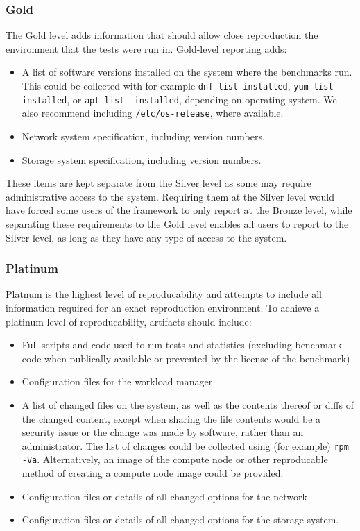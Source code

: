 \documentclass[conference]{IEEEtran}
\begin{document}
\subsubsection{Gold}

The Gold level adds information that should allow close reproduction
the environment that the tests were run in. Gold-level reporting adds:

\begin{itemize}
    \item A list of software versions installed on the system where the 
    benchmarks run. This could be collected with for example
    \texttt{dnf list installed}, \texttt{yum list installed}, or 
    \texttt{apt list --installed}, depending on operating system. We also 
    recommend including \texttt{/etc/os-release}, where available.
    \item Network system specification, including version numbers.
    \item Storage system specification, including version numbers.
\end{itemize}

These items are kept separate from the Silver level as some may require 
administrative access to the system. Requiring them at the Silver level would 
have forced some users of the framework to only report at the Bronze level, 
while separating these requirements to the Gold level enables all users to 
report to the Silver level, as long as they have any type of access to the 
system.

\subsubsection{Platinum}

Platnum is the highest level of reproducability and attempts to include all 
information required for an exact reproduction environment. To achieve a 
platinum level of reproducability, artifacts should include:

\begin{itemize}
    \item Full scripts and code used to run tests and statistics (excluding 
    benchmark code when publically available or prevented by the license of the 
    benchmark)
    \item Configuration files for the workload manager
    \item A list of changed files on the system, as well as the contents thereof 
    or diffs of the changed content, except when sharing the file contents would 
    be a security issue or the change was made by software, rather than an 
    administrator. The list of changes could be collected using (for example)
    \texttt{rpm -Va}. Alternatively, an image of the compute node or other 
    reproducable method of creating a compute node image could be provided.
    \item Configuration files or details of all changed options for the network
    \item Configuration files or details of all changed options for the storage 
    system.
\end{itemize}
\end{document}
